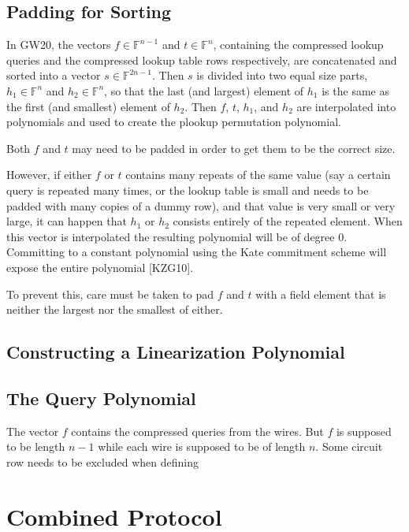 \documentclass[fleqn]{article}
\begin{document}
		\subsection{Padding for Sorting} %
		In GW20, the vectors $f \in \mathbb{F}^{n-1}$ and $t \in \mathbb{F}^n$, containing the compressed lookup queries and the compressed lookup table rows respectively, are concatenated and sorted into a vector $s \in \mathbb{F}^{2n-1}$. Then $s$ is divided into two equal size parts, $h_1 \in \mathbb{F}^n$ and $h_2 \in \mathbb{F}^n$, so that the last (and largest) element of $h_1$ is the same as the first (and smallest) element of $h_2$. Then $f$, $t$, $h_1$, and $h_2$ are interpolated into polynomials and used to create the plookup permutation polynomial.
		
		Both $f$ and $t$ may need to be padded in order to get them to be the correct size. 
		
		However, if either $f$ or $t$ contains many repeats of the same value (say a certain query is repeated many times, or the lookup table is small and needs to be padded with many copies of a dummy row), and that value is very small or very large, it can happen that $h_1$ or $h_2$ consists entirely of the repeated element. When this vector is interpolated the resulting polynomial will be of degree 0. Committing to a constant polynomial using the Kate commitment scheme will expose the entire polynomial [KZG10]. 
		
		To prevent this, care must be taken to pad $f$ and $t$ with a field element that is neither the largest nor the smallest of either.
		
		\subsection{Constructing a Linearization Polynomial} %
		\subsection{The Query Polynomial} %
		
		The vector $f$ contains the compressed queries from the wires. But $f$ is supposed to be length $n-1$ while each wire is supposed to be of length $n$. Some circuit row needs to be excluded when defining 
	\section{Combined Protocol}
\end{document}
